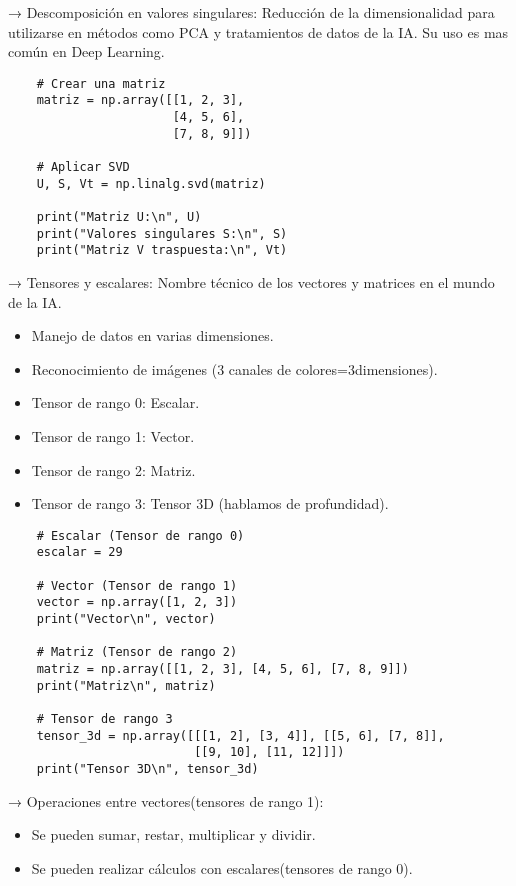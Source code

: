 \documentclass{templateNote}
\begin{document}
 → Descomposición en valores singulares: Reducción de la dimensionalidad para utilizarse en métodos como PCA y tratamientos de datos de la IA. Su uso es mas común en Deep Learning.
\begin{lstlisting}
    # Crear una matriz
    matriz = np.array([[1, 2, 3],
                       [4, 5, 6],
                       [7, 8, 9]])

    # Aplicar SVD
    U, S, Vt = np.linalg.svd(matriz)

    print("Matriz U:\n", U)
    print("Valores singulares S:\n", S)
    print("Matriz V traspuesta:\n", Vt)
\end{lstlisting}

 → Tensores y escalares: Nombre técnico de los vectores y matrices en el mundo de la IA. 
\begin{itemize}
    \item Manejo de datos en varias dimensiones.
    \item Reconocimiento de imágenes (3 canales de colores=3dimensiones).
    \item Tensor de rango 0: Escalar.
    \item Tensor de rango 1: Vector.
    \item Tensor de rango 2: Matriz.
    \item Tensor de rango 3: Tensor 3D (hablamos de profundidad).
\end{itemize}
\begin{lstlisting}
    # Escalar (Tensor de rango 0)
    escalar = 29

    # Vector (Tensor de rango 1)
    vector = np.array([1, 2, 3])
    print("Vector\n", vector)

    # Matriz (Tensor de rango 2)
    matriz = np.array([[1, 2, 3], [4, 5, 6], [7, 8, 9]])
    print("Matriz\n", matriz)

    # Tensor de rango 3
    tensor_3d = np.array([[[1, 2], [3, 4]], [[5, 6], [7, 8]], 
                          [[9, 10], [11, 12]]])
    print("Tensor 3D\n", tensor_3d)
\end{lstlisting}

 → Operaciones entre vectores(tensores de rango 1):
\begin{itemize}
    \item Se pueden sumar, restar, multiplicar y dividir.
    \item Se pueden realizar cálculos con escalares(tensores de rango 0).
\end{itemize} 
\end{document}
